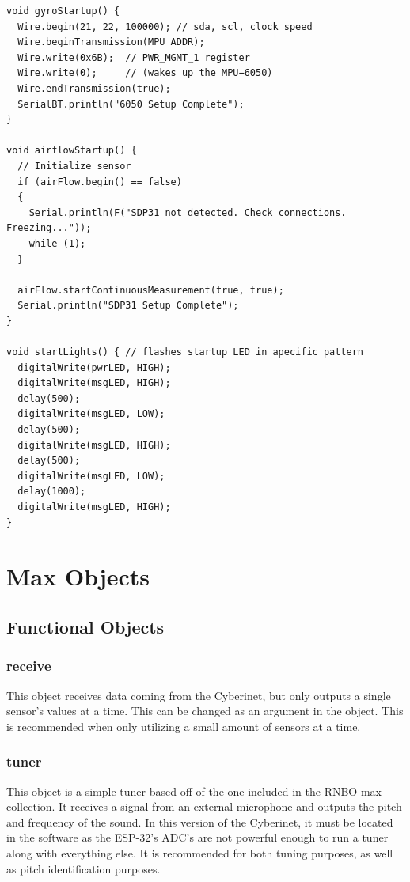 \begin{verbatim}
void gyroStartup() {
  Wire.begin(21, 22, 100000); // sda, scl, clock speed
  Wire.beginTransmission(MPU_ADDR);
  Wire.write(0x6B);  // PWR_MGMT_1 register
  Wire.write(0);     // (wakes up the MPU−6050)
  Wire.endTransmission(true);
  SerialBT.println("6050 Setup Complete");
}

void airflowStartup() {
  // Initialize sensor
  if (airFlow.begin() == false)
  {
    Serial.println(F("SDP31 not detected. Check connections. Freezing..."));
    while (1);
  }

  airFlow.startContinuousMeasurement(true, true);
  Serial.println("SDP31 Setup Complete");
}

void startLights() { // flashes startup LED in apecific pattern
  digitalWrite(pwrLED, HIGH);
  digitalWrite(msgLED, HIGH);
  delay(500);
  digitalWrite(msgLED, LOW);
  delay(500);
  digitalWrite(msgLED, HIGH);
  delay(500);
  digitalWrite(msgLED, LOW);
  delay(1000);
  digitalWrite(msgLED, HIGH);
}

\end{verbatim}

\section{Max Objects}

\subsection{Functional Objects}

\subsubsection{receive}
\vspace{5mm}

This object receives data coming from the Cyberinet, but only outputs a single sensor's values at a time. This can be changed as an argument in the object. This is recommended when only utilizing a small amount of sensors at a time.


\subsubsection{tuner}
\vspace{5mm}
This object is a simple tuner based off of the one included in the RNBO max collection. It receives a signal from an external microphone and outputs the pitch and frequency of the sound. In this version of the Cyberinet, it must be located in the software as the ESP-32's ADC's are not powerful enough to run a tuner along with everything else. It is recommended for both tuning purposes, as well as pitch identification purposes. 


